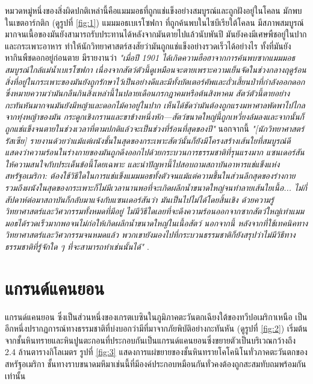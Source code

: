 \documentclass[10pt,twocolumn,letterpaper]{article}
\begin{document}
หมวดหมู่หนึ่งของสิ่งผิดปกติเหล่านี้คือแมมมอธที่ถูกแช่แข็งอย่างสมบูรณ์และถูกฝังอยู่ในโคลน มักพบในเขตอาร์กติก (ดูรูปที่ \ref{fig:1}) แมมมอธเบเรโซฟกา ที่ถูกค้นพบในไซบีเรียใต้โคลน มีสภาพสมบูรณ์มากจนเนื้อของมันยังสามารถรับประทานได้หลังจากมันตายไปแล้วนับพันปี มันยังคงมีเศษพืชอยู่ในปากและกระเพาะอาหาร ทำให้นักวิทยาศาสตร์สงสัยว่ามันถูกแช่แข็งอย่างรวดเร็วได้อย่างไร ทั้งที่มันยังหากินพืชดอกอยู่ก่อนตาย \cite{17} มีรายงานว่า \textit{"เมื่อปี 1901 ได้เกิดความฮือฮาจากการค้นพบซากแมมมอธสมบูรณ์ใกล้แม่น้ำเบเรโซฟกา เนื่องจากสัตว์ตัวนี้ดูเหมือนจะตายเพราะความเย็นจัดในช่วงกลางฤดูร้อน สิ่งที่อยู่ในกระเพาะของมันยังถูกรักษาไว้เป็นอย่างดีและมีทั้งบัตเตอร์คัพและถั่วเสี้ยนป่าที่กำลังออกดอก ซึ่งหมายความว่ามันกลืนกินสิ่งเหล่านี้ในปลายเดือนกรกฎาคมหรือต้นสิงหาคม สัตว์ตัวนี้ตายอย่างกะทันหันมากจนมันยังมีหญ้าและดอกไม้คาอยู่ในปาก เห็นได้ชัดว่ามันต้องถูกแรงมหาศาลพัดพาไปไกลจากทุ่งหญ้าของมัน กระดูกเชิงกรานและขาข้างหนึ่งหัก—สัตว์ขนาดใหญ่นี้ถูกเหวี่ยงล้มลงและจากนั้นก็ถูกแช่แข็งจนตายในช่วงเวลาที่ตามปกติแล้วจะเป็นช่วงที่ร้อนที่สุดของปี"} \cite{18} นอกจากนี้ \textit{"[นักวิทยาศาสตร์รัสเซีย] รายงานด้วยว่าแม้แต่ผนังชั้นในสุดของกระเพาะสัตว์นั้นก็ยังมีโครงสร้างเส้นใยที่สมบูรณ์ดี แสดงว่าความร้อนในร่างกายของมันถูกดึงออกไปด้วยกระบวนการธรรมชาติที่รุนแรงมาก แซนเดอร์สันให้ความสนใจกับประเด็นข้อนี้โดยเฉพาะ และนำปัญหานี้ไปสอบถามสถาบันอาหารแช่แข็งแห่งสหรัฐอเมริกา: ต้องใช้วิธีใดในการแช่แข็งแมมมอธทั้งตัวจนแม้แต่ความชื้นในส่วนลึกสุดของร่างกาย รวมถึงผนังในสุดของกระเพาะก็ไม่มีเวลานานพอที่จะเกิดผลึกน้ำขนาดใหญ่จนทำลายเส้นใยเนื้อ... ไม่กี่สัปดาห์ต่อมาสถาบันก็กลับมาแจ้งกับแซนเดอร์สันว่า มันเป็นไปไม่ได้โดยสิ้นเชิง ด้วยความรู้วิทยาศาสตร์และวิศวกรรมทั้งหมดที่มีอยู่ ไม่มีวิธีใดเลยที่จะดึงความร้อนออกจากซากสัตว์ใหญ่เท่าแมมมอธได้รวดเร็วมากพอจนไม่ก่อให้เกิดผลึกน้ำขนาดใหญ่ในเนื้อสัตว์ นอกจากนี้ หลังจากที่ใช้เทคนิคทางวิทยาศาสตร์และวิศวกรรมจนหมดแล้ว พวกเขายังมองไปที่กระบวนธรรมชาติก็ยังสรุปว่าไม่มีวิธีทางธรรมชาติที่รู้จักใด ๆ ที่จะสามารถทำเช่นนั้นได้"} \cite{19}.

\section{แกรนด์แคนยอน}

แกรนด์แคนยอน ซึ่งเป็นส่วนหนึ่งของเกรตเบซินในภูมิภาคตะวันตกเฉียงใต้ของทวีปอเมริกาเหนือ เป็นอีกหนึ่งปรากฏการณ์ทางธรรมชาติที่บ่งบอกว่ามีที่มาจากภัยพิบัติอย่างกะทันหัน (ดูรูปที่ \ref{fig:2}) เริ่มต้นจากชั้นหินทรายและหินปูนตะกอนที่ประกอบกันเป็นแกรนด์แคนยอนซึ่งขยายตัวเป็นบริเวณกว้างถึง 2.4 ล้านตารางกิโลเมตร \cite{21} รูปที่ \ref{fig:3} แสดงการแผ่ขยายของชั้นหินทรายโคโคนิโนทั่วภาคตะวันตกของสหรัฐอเมริกา ชั้นทางราบขนาดมหึมาเช่นนี้ที่มีองค์ประกอบหมือนกันทั่วคงต้องถูกสะสมทับถมพร้อมกันเท่านั้น
\end{document}
